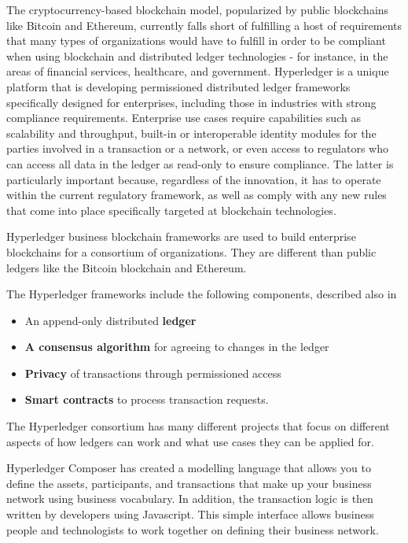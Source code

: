 The cryptocurrency-based blockchain model, popularized by public blockchains like Bitcoin and Ethereum, currently falls short of fulfilling a host of requirements that many types of organizations would have to fulfill in order to be compliant when using blockchain and distributed ledger technologies - for instance, in the areas of financial services, healthcare, and government.
Hyperledger is a unique platform that is developing permissioned distributed ledger frameworks specifically designed for enterprises, including those in industries with strong compliance requirements. Enterprise use cases require capabilities such as scalability and throughput, built-in or interoperable identity modules for the parties involved in a transaction or a network, or even access to regulators who can access all data in the ledger as read-only to ensure compliance. The latter is particularly important because, regardless of the innovation, it has to operate within the current regulatory framework, as well as comply with any new rules that come into place specifically targeted at blockchain technologies.

Hyperledger business blockchain frameworks are used to build enterprise blockchains for a consortium of organizations. They are different than public ledgers like the Bitcoin blockchain and Ethereum.

The Hyperledger frameworks include the following components, described also in  
	\begin{itemize}
	\item An append-only distributed \textbf{ledger}
	\item \textbf{A consensus algorithm} for agreeing to changes in the ledger
	\item \textbf{Privacy} of transactions through permissioned access
	\item \textbf{Smart contracts} to process transaction requests.
	\end{itemize}



The Hyperledger consortium has many different projects that focus on different aspects of how ledgers can work and what use cases they can be applied for.

Hyperledger Composer has created a modelling language that allows you to define the assets, participants, and transactions that make up your business network using business vocabulary. In addition, the transaction logic is then written by developers using Javascript. This simple interface allows business people and technologists to work together on defining their business network.

